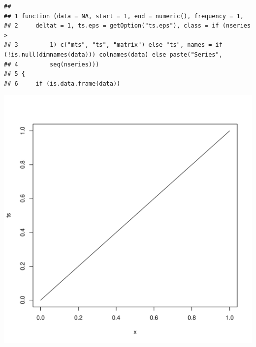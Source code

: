 \documentclass[12pt,english,french,twoside]{report}\usepackage[]{graphicx}\usepackage[]{color}
\makeatletter
\def\maxwidth{ %
  \ifdim\Gin@nat@width>\linewidth
    \linewidth
  \else
    \Gin@nat@width
  \fi
}
\newenvironment{kframe}{%
 \def\at@end@of@kframe{}%
 \ifinner\ifhmode%
  \def\at@end@of@kframe{\end{minipage}}%
  \begin{minipage}{\columnwidth}%
 \fi\fi%
 \def\FrameCommand##1{\hskip\@totalleftmargin \hskip-\fboxsep
 \colorbox{shadecolor}{##1}\hskip-\fboxsep
     \hskip-\linewidth \hskip-\@totalleftmargin \hskip\columnwidth}%
 \MakeFramed {\advance\hsize-\width
   \@totalleftmargin\z@ \linewidth\hsize
   \@setminipage}}%
 {\par\unskip\endMakeFramed%
 \at@end@of@kframe}
\newenvironment{knitrout}{}{} %
\makeatother
\begin{document}
\begin{knitrout}
\color{fgcolor}\begin{kframe}


{\ttfamily\noindent\bfseries\color{errorcolor}{\#\# Error: objet de type 'closure' non indiçable}}\begin{verbatim}
##                                                                                                                            
## 1 function (data = NA, start = 1, end = numeric(), frequency = 1,                                                          
## 2     deltat = 1, ts.eps = getOption("ts.eps"), class = if (nseries >                                                      
## 3         1) c("mts", "ts", "matrix") else "ts", names = if (!is.null(dimnames(data))) colnames(data) else paste("Series", 
## 4         seq(nseries)))                                                                                                   
## 5 {                                                                                                                        
## 6     if (is.data.frame(data))
\end{verbatim}
\end{kframe}
\includegraphics[width=\maxwidth]{figure/stAnne_tx_moyen_passages} 
\begin{kframe}


\end{kframe}
\end{knitrout}
\end{document}
